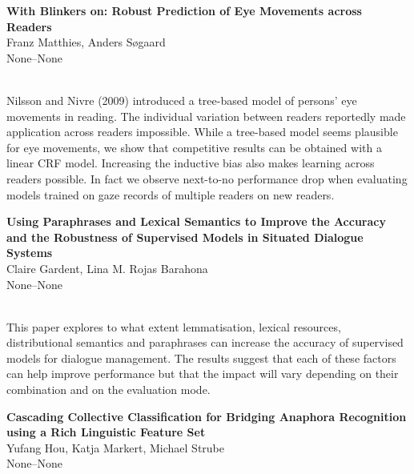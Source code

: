 \documentclass[twoside,makeidx]{book}
\renewcommand{\normalsize}{\fontsize{8}{9}\selectfont}
\renewcommand{\small}{\fontsize{7}{8}\selectfont}
\begin{document}
\par\vspace{2em}\noindent%
\begin{minipage}{\linewidth}%
\begin{center}
\textbf{\normalsize With Blinkers on: Robust Prediction of Eye Movements across Readers}\\
\normalsize  Franz Matthies,  Anders S{\o}gaard\\
{\small None--None}\\
\end{center}
\end{minipage}\\[0.5em]
\nopagebreak%
\noindent%
{\small Nilsson and Nivre (2009) introduced a tree-based model of persons' eye movements in reading. The individual variation between readers reportedly made application across readers impossible. While a tree-based model seems plausible for eye movements, we show that competitive results can be obtained with a linear CRF model. Increasing the inductive bias also makes learning across readers possible. In fact we observe next-to-no performance drop when evaluating models trained on gaze records of multiple readers on new readers.}
\par\vspace{2em}\noindent%
\begin{minipage}{\linewidth}%
\begin{center}
\textbf{\normalsize Using Paraphrases and Lexical Semantics to Improve the Accuracy and the Robustness of Supervised Models in Situated Dialogue Systems}\\
\normalsize  Claire Gardent,  Lina M. Rojas Barahona\\
{\small None--None}\\
\end{center}
\end{minipage}\\[0.5em]
\nopagebreak%
\noindent%
{\small This paper explores to what extent lemmatisation, lexical resources, distributional semantics and paraphrases can increase the accuracy of  supervised models for dialogue management. The results suggest that  each of these factors can help improve performance but that the  impact will vary depending on their combination and on the evaluation  mode.}
\par\vspace{2em}\noindent%
\begin{minipage}{\linewidth}%
\begin{center}
\textbf{\normalsize Cascading Collective Classification for Bridging Anaphora Recognition using a Rich Linguistic Feature Set}\\
\normalsize  Yufang Hou,  Katja Markert,  Michael Strube\\
{\small None--None}\\
\end{center}
\end{minipage}\\[0.5em]
\end{document}
